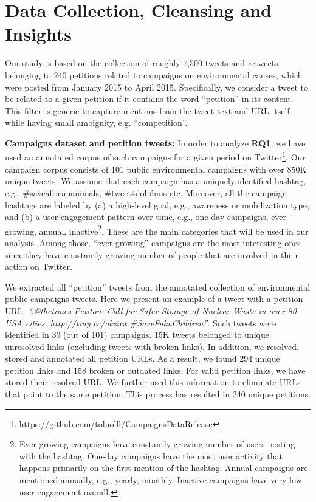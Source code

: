 \section{Data Collection, Cleansing and Insights}
\label{sec:dataset}

Our study is based on the collection of roughly 7,500 tweets and retweets belonging to 240 petitions related to campaigns on environmental causes, which were posted from January 2015 to April 2015. Specifically, we consider a tweet to be related to a given petition if it contains the word ``petition'' in its content. This filter is generic to capture mentions from the tweet text and URL itself while having small ambiguity, e.g. ``competition''.

\textbf{Campaigns dataset and petition tweets:}
In order to analyze \textbf{RQ1},
we have used an annotated corpus of such campaigns for a given period on Twitter\footnote{https://github.com/toluolll/CampaignsDataRelease}.
Our campaign corpus consists of 101 public environmental campaigns with over 850K unique tweets. 
We assume that each campaign has a uniquely identified hashtag, e.g., \#saveafricananimals, \#tweet4dolphins etc.
Moreover, all the campaign hashtags are labeled by (a) a high-level goal, e.g., awareness or mobilization type, and (b) a user engagement pattern over time, e.g., one-day campaigns, ever-growing, annual, inactive\footnote{
Ever-growing campaigns have constantly growing number of users posting with the hashtag.
One-day campaigns have the most user activity that happens primarily on the first mention of the hashtag.
Annual campaigns are mentioned annually, e.g., yearly, monthly. Inactive campaigns have very low user engagement overall.}.
These are the main categories that will be used in our analysis.
Among those, ``ever-growing'' campaigns are the most interesting ones since they have constantly growing number of people that are involved in their action on Twitter.

We extracted all ``petition'' tweets from the annotated collection of environmental public campaigns tweets.
Here we present an example of a tweet with a petition URL: \textit{``.@thetimes Petiton: Call for Safer Storage of Nuclear Waste in over 80 USA cities. http://tiny.cc/okzicx  \#SaveFukuChildren''}.
Such tweets were identified in 39 (out of 101) campaigns. 15K tweets belonged to unique unresolved links (excluding tweets with broken links).
In addition, we resolved, stored and annotated all petition URLs. As a result, we found 294 unique petition links and 158 broken or outdated links.
For valid petition links, we have stored their resolved URL. We further used this information to eliminate URLs that point to the same petition.
This process has resulted in 240 unique petitions.

